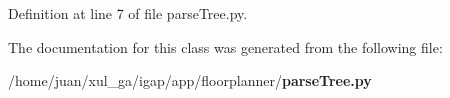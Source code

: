 \subsubsection{}\label{classapp_1_1floorplanner_1_1parseTree_1_1tree__node_9eeaa1cb0ce51526449066a14480e7c3}




Definition at line 7 of file parseTree.py.

The documentation for this class was generated from the following file:\begin{CompactItemize}
\item 
/home/juan/xul\_\-ga/igap/app/floorplanner/{\bf parseTree.py}\end{CompactItemize}
